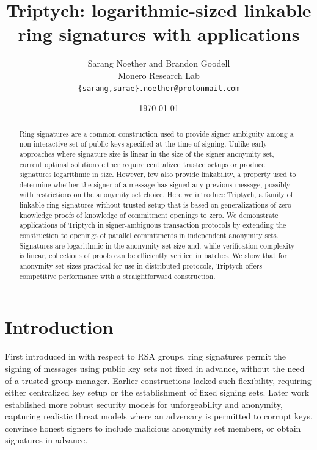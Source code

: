 \documentclass{article}
\title{Triptych: logarithmic-sized linkable ring signatures with applications}
\author{Sarang Noether and Brandon Goodell \\ Monero Research Lab \\ \texttt{\{sarang,surae\}.noether@protonmail.com}}
\date{\today}
\theoremstyle{definition}
\begin{document}
\maketitle


\begin{abstract}
Ring signatures are a common construction used to provide signer ambiguity among a non-interactive set of public keys specified at the time of signing.
Unlike early approaches where signature size is linear in the size of the signer anonymity set, current optimal solutions either require centralized trusted setups or produce signatures logarithmic in size.
However, few also provide linkability, a property used to determine whether the signer of a message has signed any previous message, possibly with restrictions on the anonymity set choice.
Here we introduce Triptych, a family of linkable ring signatures without trusted setup that is based on generalizations of zero-knowledge proofs of knowledge of commitment openings to zero.
We demonstrate applications of Triptych in signer-ambiguous transaction protocols by extending the construction to openings of parallel commitments in independent anonymity sets.
Signatures are logarithmic in the anonymity set size and, while verification complexity is linear, collections of proofs can be efficiently verified in batches.
We show that for anonymity set sizes practical for use in distributed protocols, Triptych offers competitive performance with a straightforward construction.
\end{abstract}


\section{Introduction}
First introduced in \cite{rivest} with respect to RSA groups, ring signatures permit the signing of messages using public key sets not fixed in advance, without the need of a trusted group manager.
Earlier constructions lacked such flexibility, requiring either centralized key setup or the establishment of fixed signing sets.
Later work \cite{bender} established more robust security models for unforgeability and anonymity, capturing realistic threat models where an adversary is permitted to corrupt keys, convince honest signers to include malicious anonymity set members, or obtain signatures in advance.
\end{document}
